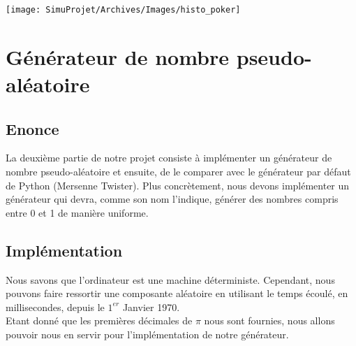 \documentclass[french]{article}
\begin{document}
	\begin{center}
		\texttt{[image: SimuProjet/Archives/Images/histo\_poker]}
	\end{center}

\section{Générateur de nombre pseudo-aléatoire}
\subsection{Enonce}
La deuxième partie de notre projet consiste à implémenter un générateur de nombre pseudo-aléatoire et ensuite, de le comparer avec le générateur par défaut de Python (Mersenne Twister). Plus concrètement, nous devons implémenter un générateur qui devra, comme son nom l'indique, générer des nombres compris entre 0 et 1
de manière uniforme.

\subsection{Implémentation}
Nous savons que l'ordinateur est une machine déterministe. Cependant, nous pouvons faire ressortir une composante aléatoire en utilisant le temps écoulé, en millisecondes, depuis le $1^{er}$ Janvier 1970.
\\
Etant donné que les premières décimales de  $\pi$ nous sont fournies, nous allons pouvoir nous en servir pour l'implémentation de notre générateur. 
\end{document}
